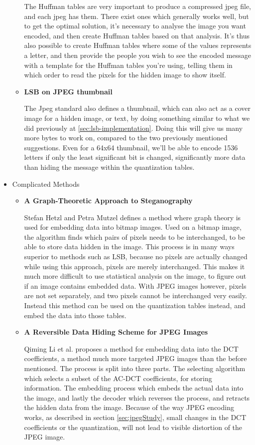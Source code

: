 \begin{itemize}
\begin{itemize}
		The Huffman tables are very important to produce a compressed jpeg file, and each jpeg has them.
		There exist ones which generally works well, but to get the optimal solution, it's necessary to analyse the image you want encoded, and then create Huffman tables based on that analysis.
		It's thus also possible to create Huffman tables where some of the values represents a letter, and then provide the people you wish to see the encoded message with a template for the Huffman tables you're using, telling them in which order to read the pixels for the hidden image to show itself.
		\item \textbf{LSB on JPEG thumbnail}

		The Jpeg standard also defines a thumbnail, which can also act as a cover image for a hidden image, or text, by doing something similar to what we did previously at \ref{sec:lsb-implementation}.
		Doing this will give us many more bytes to work on, compared to the two previously mentioned suggestions.
		Even for a 64x64 thumbnail, we'll be able to encode 1536 letters if only the least significant bit is changed, significantly more data than hiding the message within the quantization tables.
	\end{itemize}
	\item Complicated Methods
	\begin{itemize}
		\item \textbf{A Graph-Theoretic Approach to Steganography}
		
		Stefan Hetzl and Petra Mutzel defines a method where graph theory is used for embedding data into bitmap images\citep{hetzl_2005}. Used on a bitmap image, the algorithm finds which pairs of pixels needs to be interchanged, to be able to store data hidden in the image. This process is in many ways superior to methods such as LSB, because no pixels are actually changed while using this approach, pixels are merely interchanged. This makes it much more difficult to use statistical analysis on the image, to figure out if an image contains embedded data. With JPEG images however, pixels are not set separately, and two pixels cannot be interchanged very easily. Instead this method can be used on the quantization tables instead, and embed the data into those tables.

		\item \textbf{A Reversible Data Hiding Scheme for JPEG Images}
		
		Qiming Li et al. proposes a method for embedding data into the DCT coefficients\citep{Li2010}, a method much more targeted JPEG images than the before mentioned. The process is split into three parts. The selecting algorithm which selects a subset of the AC-DCT coefficients, for storing information. The embedding process which embeds the actual data into the image, and lastly the decoder which reverses the process, and retracts the hidden data from the image. Because of the way JPEG encoding works, as described in section \ref{sec:jpegStudy}, small changes in the DCT coefficients or the quantization, will not lead to visible distortion of the JPEG image.

	\end{itemize}
\end{itemize}
